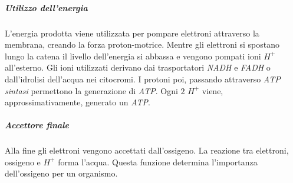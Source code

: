 					\subparagraph{Utilizzo dell'energia}
					L'energia prodotta viene utilizzata per pompare elettroni attraverso la membrana, creando la forza proton-motrice. 
					Mentre gli elettroni si spostano lungo la catena il livello dell'energia si abbassa e vengono pompati ioni \emph{$H^{+}$} all'esterno.
					Gli ioni utilizzati derivano dai trasportatori \emph{NADH} e \emph{FADH} o dall'idrolisi dell'acqua nei citocromi.
					I protoni poi, passando attraverso \emph{ATP sintasi} permettono la generazione di \emph{ATP}.
					Ogni $2$ \emph{$H^{+}$} viene, approssimativamente, generato un \emph{ATP}.

					\subparagraph{Accettore finale}
					Alla fine gli elettroni vengono accettati dall'ossigeno. 
					La reazione tra elettroni, ossigeno e \emph{$H^{+}$} forma l'acqua. 
					Questa funzione determina l'importanza dell'ossigeno per un organismo.

